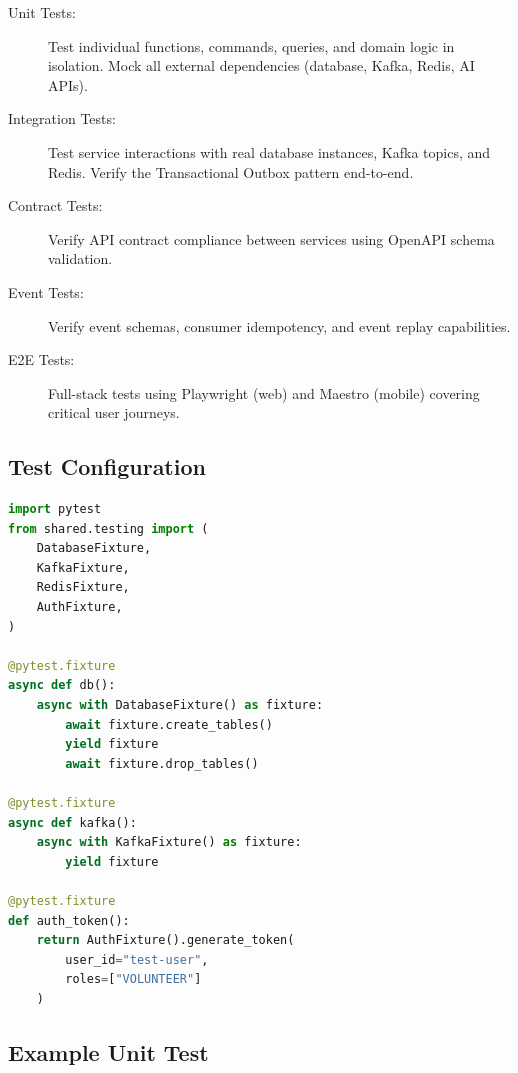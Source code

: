 \begin{description}
  \item[Unit Tests:] Test individual functions, commands, queries, and domain logic in isolation. Mock all external dependencies (database, Kafka, Redis, AI APIs).
  \item[Integration Tests:] Test service interactions with real database instances, Kafka topics, and Redis. Verify the Transactional Outbox pattern end-to-end.
  \item[Contract Tests:] Verify API contract compliance between services using OpenAPI schema validation.
  \item[Event Tests:] Verify event schemas, consumer idempotency, and event replay capabilities.
  \item[E2E Tests:] Full-stack tests using Playwright (web) and Maestro (mobile) covering critical user journeys.
\end{description}

\subsection{Test Configuration}

\begin{lstlisting}[language=Python, caption=Test Fixtures]
import pytest
from shared.testing import (
    DatabaseFixture,
    KafkaFixture,
    RedisFixture,
    AuthFixture,
)

@pytest.fixture
async def db():
    async with DatabaseFixture() as fixture:
        await fixture.create_tables()
        yield fixture
        await fixture.drop_tables()

@pytest.fixture
async def kafka():
    async with KafkaFixture() as fixture:
        yield fixture

@pytest.fixture
def auth_token():
    return AuthFixture().generate_token(
        user_id="test-user",
        roles=["VOLUNTEER"]
    )
\end{lstlisting}

\subsection{Example Unit Test}

